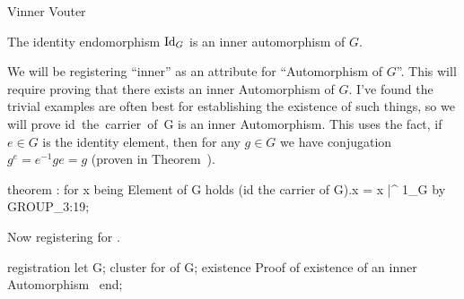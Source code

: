\nwenddocs{}\plusendmoddef\nwstartdeflinemarkup{}\nwenddeflinemarkup
Vinner
Vouter
\nwendcode{}\nwdocspar

\begin{theorem}\label{thm:characteristic:id-inner}
The identity endomorphism $\operatorname{Id}_{G}$ is an inner automorphism of $G$.
\end{theorem}

We will be registering ``inner'' as an attribute for ``Automorphism
of $G$''. This will require proving that there exists an inner
Automorphism of $G$. I've found the trivial examples are often best for
establishing the existence of such things, so we will prove {\Tt{}id\ the\ carrier\ of\ G\nwendquote} is
an inner Automorphism. This uses the fact, if $e\in G$ is the identity
element, then for any $g\in G$ we have conjugation $g^{e} = e^{-1}ge=g$
(proven in Theorem~).

\nwenddocs{}\endmoddef\nwstartdeflinemarkup{}\nwenddeflinemarkup
theorem :
  for x being Element of G holds (id the carrier of G).x = x |^ 1_G
  by GROUP_3:19;
\eatline
{}\nwendcode{}\nwdocspar
\begin{registration}
Now registering {\Tt{}\nwendquote} for {\Tt{}\nwendquote}.
\end{registration}

\nwenddocs{}\endmoddef\nwstartdeflinemarkup{}\nwenddeflinemarkup
registration
  let G;
  cluster  for  of G;
  existence
  \LA{}Proof of existence of an inner Automorphism~{\nwtagstyle{}}\RA{}
end;
\nwendcode{}\nwdocspar

